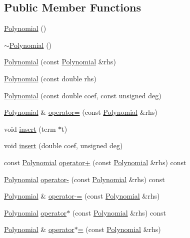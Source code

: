 \subsection*{Public Member Functions}
\begin{CompactItemize}
\item 
\hyperlink{classPolynomial_961dec5c0727f03e5273f74a345dfbb6}{Polynomial} ()
\item 
\hyperlink{classPolynomial_96130e913259691bd82b7d910d586169}{$\sim$Polynomial} ()
\item 
\hyperlink{classPolynomial_fa571a95bc93973b6727e4bdbda7a43d}{Polynomial} (const \hyperlink{classPolynomial}{Polynomial} \&rhs)
\item 
\hyperlink{classPolynomial_91d11d1fc330f36c78de3527692e5bf2}{Polynomial} (const double rhs)
\item 
\hyperlink{classPolynomial_2fdf4061d1783d216de7a6c24768cef0}{Polynomial} (const double coef, const unsigned deg)
\item 
\hyperlink{classPolynomial}{Polynomial} \& \hyperlink{classPolynomial_76d719fc2a24feb250ee2dbddcb6c8bb}{operator=} (const \hyperlink{classPolynomial}{Polynomial} \&rhs)
\item 
void \hyperlink{classPolynomial_b141080a5700f160d4bd1d68cecfd50f}{insert} (term $\ast$t)
\item 
void \hyperlink{classPolynomial_47a8de184c159d413235dbb3a192554d}{insert} (double coef, unsigned deg)
\item 
const \hyperlink{classPolynomial}{Polynomial} \hyperlink{classPolynomial_74b75f9d3274a46baa91c84fc5aad1f8}{operator+} (const \hyperlink{classPolynomial}{Polynomial} \&rhs) const 
\item 
\hyperlink{classPolynomial}{Polynomial} \hyperlink{classPolynomial_cff0b8a8c385f43f9d57c80ee925d858}{operator-} (const \hyperlink{classPolynomial}{Polynomial} \&rhs) const 
\item 
\hyperlink{classPolynomial}{Polynomial} \& \hyperlink{classPolynomial_f89937a0177661ce28acabddc5a9cfaf}{operator-=} (const \hyperlink{classPolynomial}{Polynomial} \&rhs)
\item 
\hyperlink{classPolynomial}{Polynomial} \hyperlink{classPolynomial_1e00f25b4de1d335f437749c7bd93ac9}{operator$\ast$} (const \hyperlink{classPolynomial}{Polynomial} \&rhs) const 
\item 
\hyperlink{classPolynomial}{Polynomial} \& \hyperlink{classPolynomial_cd98d02bf606b1f1cd7503d7e3b295a6}{operator$\ast$=} (const \hyperlink{classPolynomial}{Polynomial} \&rhs)
\item 

\end{CompactItemize}
